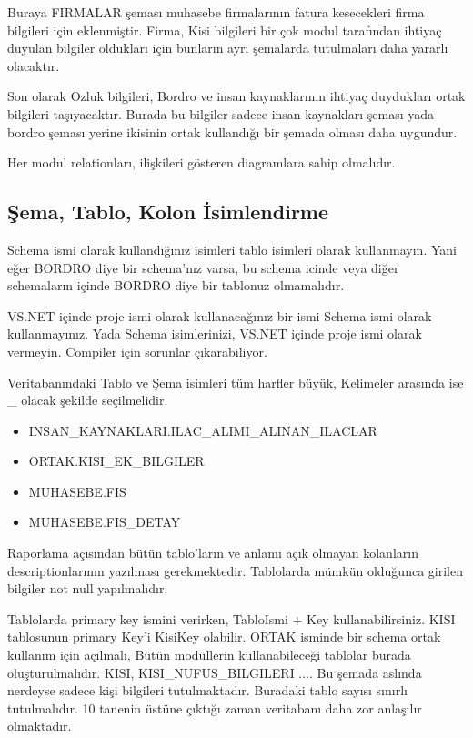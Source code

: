 \documentclass[10pt,a4paper]{article}
\begin{document}
Buraya FIRMALAR şeması muhasebe firmalarının fatura kesecekleri firma bilgileri için eklenmiştir.
Firma, Kisi bilgileri bir çok modul tarafından ihtiyaç duyulan bilgiler oldukları için bunların
ayrı şemalarda tutulmaları daha yararlı olacaktır.

Son olarak Ozluk bilgileri, Bordro ve insan kaynaklarının ihtiyaç duydukları ortak bilgileri taşıyacaktır.
Burada bu bilgiler sadece insan kaynakları şeması yada bordro şeması yerine ikisinin ortak kullandığı
bir şemada olması daha uygundur.

Her modul relationları, ilişkileri gösteren diagramlara sahip olmalıdır.



\subsection{Şema, Tablo, Kolon İsimlendirme}

Schema ismi olarak kullandığınız isimleri tablo isimleri olarak kullanmayın. 
Yani eğer BORDRO diye bir schema'nız varsa,	bu schema icinde veya 
diğer schemaların içinde BORDRO diye bir tablonuz olmamalıdır.


VS.NET içinde proje ismi olarak kullanacağınız bir ismi Schema ismi  olarak kullanmayınız.
Yada Schema isimlerinizi, VS.NET içinde	proje ismi  olarak vermeyin.
Compiler için sorunlar çıkarabiliyor.		 


Veritabanındaki Tablo ve Şema isimleri tüm harfler büyük, Kelimeler arasında ise \_ olacak şekilde seçilmelidir.

\begin{itemize}
\item INSAN\_KAYNAKLARI.ILAC\_ALIMI\_ALINAN\_ILACLAR		 
\item ORTAK.KISI\_EK\_BILGILER		 
\item MUHASEBE.FIS		 
\item MUHASEBE.FIS\_DETAY 

\end{itemize}




Raporlama açısından bütün tablo'ların ve anlamı açık olmayan kolanların 
  descriptionlarının yazılması gerekmektedir.		 
  			Tablolarda mümkün olduğunca girilen bilgiler not null yapılmalıdır.
  		 
  			Tablolarda primary key ismini verirken, TabloIsmi + Key 
  kullanabilirsiniz. KISI tablosunun primary Key'i KisiKey olabilir.		 
  			ORTAK isminde bir schema ortak kullanım için açılmalı, Bütün modüllerin 
  kullanabileceği tablolar burada oluşturulmalıdır.			KISI, KISI\_NUFUS\_BILGILERI 
  .... Bu şemada aslında nerdeyse sadece kişi bilgileri tutulmaktadır.
  Buradaki tablo sayısı sınırlı tutulmalıdır. 10 tanenin üstüne çıktığı zaman
  veritabanı daha zor anlaşılır olmaktadır.
  
\end{document}
